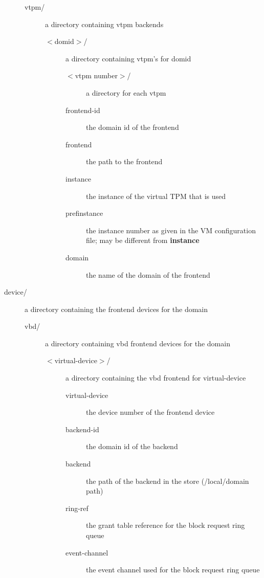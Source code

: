 \documentclass[11pt,twoside,final,openright,a4paper]{report}
\begin{document}
\begin{description}
\begin{description}
  \item[vtpm/] a directory containing vtpm backends
    \begin{description}
    \item[$<$domid$>$/] a directory containing vtpm's for domid
      \begin{description}
      \item[$<$vtpm number$>$/] a directory for each vtpm
      \item[frontend-id] the domain id of the frontend
      \item[frontend] the path to the frontend
      \item[instance] the instance of the virtual TPM that is used
      \item[pref{\textunderscore}instance] the instance number as given in the VM configuration file;
           may be different from {\bf instance}
      \item[domain] the name of the domain of the frontend
      \end{description}
    \end{description}

  \end{description}

  \item[device/] a directory containing the frontend devices for the
    domain
    \begin{description}
    \item[vbd/] a directory containing vbd frontend devices for the
      domain
      \begin{description}
      \item[$<$virtual-device$>$/] a directory containing the vbd frontend for
	virtual-device
	\begin{description}
	\item[virtual-device] the device number of the frontend device
	\item[backend-id] the domain id of the backend
	\item[backend] the path of the backend in the store (/local/domain
	  path)
	\item[ring-ref] the grant table reference for the block request
	  ring queue
	\item[event-channel] the event channel used for the block request
	  ring queue
	\end{description}
	

\end{description}
\end{description}
\end{description}
\end{document}
